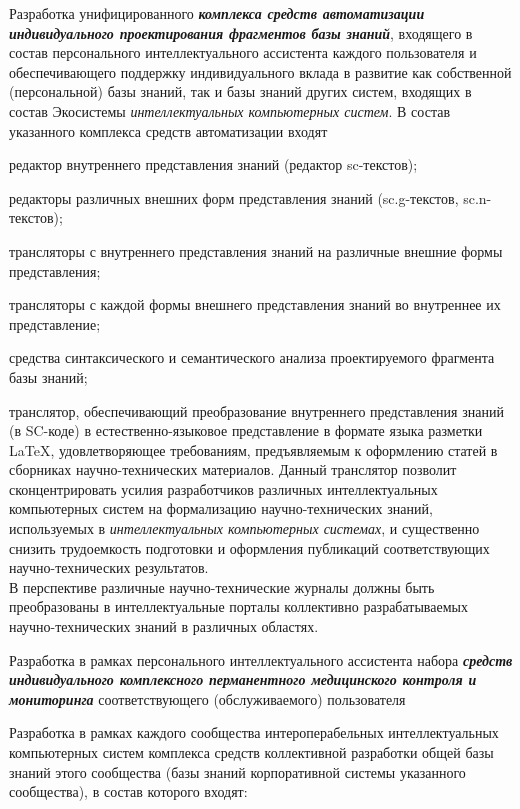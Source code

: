 \begin{textitemize}
\begin{textitemize}
	\end{textitemize}
	\item
	Разработка унифицированного \textbf{\textit{комплекса средств автоматизации индивидуального проектирования фрагментов базы знаний}}, входящего в состав персонального интеллектуального ассистента каждого пользователя и обеспечивающего поддержку индивидуального вклада в развитие как собственной (персональной) базы знаний, так и базы знаний других систем, входящих в состав Экосистемы \textit{интеллектуальных компьютерных систем}. В состав указанного комплекса средств автоматизации входят
	\begin{textitemize}
		\item редактор внутреннего представления знаний (редактор sc-текстов);
		\item редакторы различных внешних форм представления знаний (sc.g-текстов, sc.n-текстов);
		\item трансляторы с внутреннего представления знаний на различные внешние формы представления;
		\item трансляторы с каждой формы внешнего представления знаний во внутреннее их представление;
		\item средства синтаксического и семантического анализа проектируемого фрагмента базы знаний;
		\item транслятор, обеспечивающий преобразование внутреннего представления знаний (в SC-коде) в естествен\-но-языковое представление в формате языка разметки LaTeX, удовлетворяющее требованиям, предъявляемым к оформлению статей в сборниках научно-технических материалов. Данный транслятор позволит сконцентрировать усилия разработчиков различных интеллектуальных компьютерных систем на формализацию научно-технических знаний, используемых в \textit{интеллектуальных компьютерных системах}, и существенно снизить трудоемкость подготовки и оформления публикаций соответствующих научно-технических результатов.\\
		В перспективе различные научно-технические журналы должны быть преобразованы в интеллектуальные порталы коллективно разрабатываемых научно-технических знаний в различных областях.
	\end{textitemize}
	\item
	Разработка в рамках персонального интеллектуального ассистента набора \textbf{\textit{средств индивидуального комплексного перманентного медицинского контроля и мониторинга}} соответствующего (обслуживаемого) пользователя
	\medskip
	\item Разработка в рамках каждого сообщества интероперабельных интеллектуальных компьютерных систем комплекса средств коллективной разработки общей базы знаний этого сообщества (базы знаний корпоративной системы указанного сообщества), в состав которого входят:

\end{textitemize}
